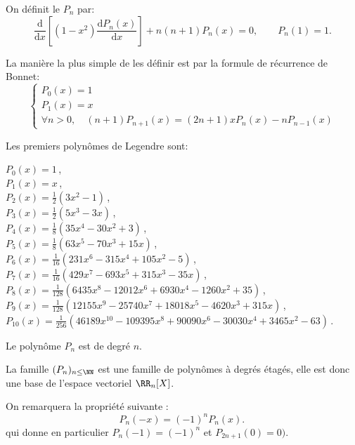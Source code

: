 On définit le  $P_n$ par:
\begin{equation}
\frac{\textrm{d}}{\textrm{d}x}[(1-x^{2})\frac{\textrm{d}P_n(x)}{\textrm{d}x}]+n(n+1)P_n(x)=0,\qquad P_n(1)=1.
\end{equation}

\medskip
La manière la plus simple de les définir est par la formule de récurrence de Bonnet:
\begin{equation}\left\{
\begin{array}{l}
P_0(x)=1\\
P_1(x)=x\\
\forall n>0, \quad

    (n+1)P_{n+1}(x)=(2n+1)xP_n(x) - nP_{n-1}(x)
\end{array} 
\right.
\end{equation}

\medskip
{}
Les premiers polynômes de Legendre sont:

\noindent
    $P_{0}(x)=1\,$,\\
    $P_{1}(x)=x\,$,\\
    $P_{2}(x)=\frac{1}{2}(3x^{2}-1)\,$,\\
    $P_{3}(x)=\frac{1}{2}(5x^{3}-3x)\,$,\\
    $P_{4}(x)=\frac{1}{8}(35x^{4}-30x^{2}+3)\,$,\\
    $P_{5}(x)=\frac{1}{8}(63x^{5}-70x^{3}+15x)\,$,\\
    $P_{6}(x)=\frac{1}{16}(231x^{6}-315x^{4}+105x^{2}-5)\,$,\\
    $P_{7}(x)=\frac{1}{16}(429x^{7}-693x^{5}+315x^{3}-35x)\,$,\\
    $P_{8}(x)=\frac{1}{128}(6435x^{8}-12012x^{6}+6930x^{4}-1260x^{2}+35)\,$,\\
    $P_{9}(x)=\frac{1}{128}(12155x^{9}-25740x^{7}+18018x^{5}-4620x^{3}+315x)\,$,\\
    $P_{10}(x)=\frac{1}{256}(46189x^{10}-109395x^{8}+90090x^{6}-30030x^{4}+3465x^{2}-63)\,$.

\medskip
Le polynôme $P_n$ est de degré $n$.

La famille $(P_n)_{n\leq \NN}$ est une famille de polynômes à degrés étagés, 
elle est donc une base de l'espace vectoriel $\RR_n[X]$.

\medskip
On remarquera la propriété suivante :
\begin{equation}
    P_n(-x)=(-1)^nP_n(x).\,
\end{equation}
qui donne en particulier $P_n( - 1) = ( - 1)^n$ et $P_{2n + 1}(0) = 0)$.

